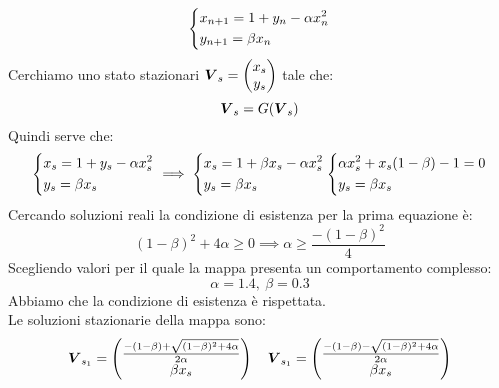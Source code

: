 \begin{exmp}
   \[\begin{dcases}
       x_{n+1}=1+y_n - \alpha x_n^2\\
       y_{n+1}=\beta x_n
   \end{dcases}\]  
   Cerchiamo uno stato stazionari $\boldsymbol{V}_s = \begin{pmatrix} x_s \\ y_s \end{pmatrix} $ tale che:
   \[
       \boldsymbol{V}_s = G(\boldsymbol{V}_s)
   \] 
   Quindi serve che:
   \[\begin{dcases}
       x_{s}=1+y_s - \alpha x_s^2\\
       y_{s}=\beta x_s
   \end{dcases}
   \implies 
   \begin{dcases}
       x_s = 1 + \beta x_s - \alpha x_s^2\\
       y_s = \beta x_s
   \end{dcases}
   \begin{dcases}
       \alpha x_s^2 + x_s(1-\beta)-1 = 0\\
       y_s = \beta x_s
   \end{dcases}
   \] 
   Cercando soluzioni reali la condizione di esistenza per la prima equazione è:
   \[
       (1-\beta)^2 + 4\alpha  \ge 0 \implies  \alpha  \ge \frac{-(1-\beta)^2}{4}
   \] 
   Scegliendo valori per il quale la mappa presenta un comportamento complesso:
   \[
       \alpha  = 1.4, \ \beta  = 0.3
   \] 
   Abbiamo che la condizione di esistenza è rispettata.\\
   Le soluzioni stazionarie della mappa sono:
   \[
       \boldsymbol{V}_{s_1}= \begin{pmatrix} \frac{-(1-\beta)+ \sqrt{(1-\beta)^2+4\alpha} }{2\alpha}\\ \beta x_s \end{pmatrix} \quad
       \boldsymbol{V}_{s_1}= \begin{pmatrix} \frac{-(1-\beta)- \sqrt{(1-\beta)^2+4\alpha} }{2\alpha}\\ \beta x_s \end{pmatrix} 
   \] 
\end{exmp}
\noindent

